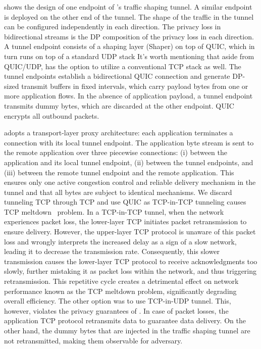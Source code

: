  shows the design of one endpoint of {\sys}’s traffic shaping tunnel. A similar endpoint is deployed on the other end of the tunnel.
The shape of the traffic in the tunnel can be configured independently in each direction. The privacy loss in bidirectional streams is the DP composition of the privacy loss in each direction.
A tunnel endpoint consists of a shaping layer (Shaper) on top of QUIC, which in turn runs on top of a standard UDP stack
It's worth mentioning that aside from QUIC/UDP, {\sys} has the option to utilize a conventional TCP stack as well.
The tunnel endpoints establish a bidirectional QUIC connection and generate DP-sized transmit buffers in fixed intervals, which carry payload bytes from one or more application flows.
In the absence of application payload, a tunnel endpoint transmits dummy bytes, which are discarded at the other endpoint.
QUIC encrypts all outbound packets.

{\sys} adopts a transport-layer proxy architecture: each application terminates a connection with its local tunnel endpoint.
The application byte stream is sent to the remote application over three piecewise connections: 
(i) between the application and its local tunnel endpoint,
(ii) between the tunnel endpoints, and
(iii) between the remote tunnel endpoint and the remote application.
This ensures only one active congestion control and reliable delivery mechanism in the tunnel and that all bytes are subject to identical mechanisms.
We discard tunneling TCP through TCP and use QUIC as TCP-in-TCP tunneling causes TCP meltdown~\cite{honda2005tcpovertcp, tcp-meltdown} problem.
In a TCP-in-TCP tunnel, when the network experiences packet loss, the lower-layer TCP initiates packet retransmission to ensure delivery.
However, the upper-layer TCP protocol is unaware of this packet loss and wrongly interprets the increased delay as a sign of a slow network, leading it to decrease the transmission rate.
Consequently, this slower transmission causes the lower-layer TCP protocol to receive acknowledgments too slowly, further mistaking it as packet loss within the network, and thus triggering retransmission.
This repetitive cycle creates a detrimental effect on network performance known as the TCP meltdown problem, significantly degrading overall efficiency.
The other option was to use TCP-in-UDP tunnel. 
This, however, violates the privacy guarantees of {\sys}.
In case of packet losses, the application TCP protocol retransmits data to guarantee data delivery. 
On the other hand, the dummy bytes that are injected in the traffic shaping tunnel are not retransmitted, making them observable for adversary. 


